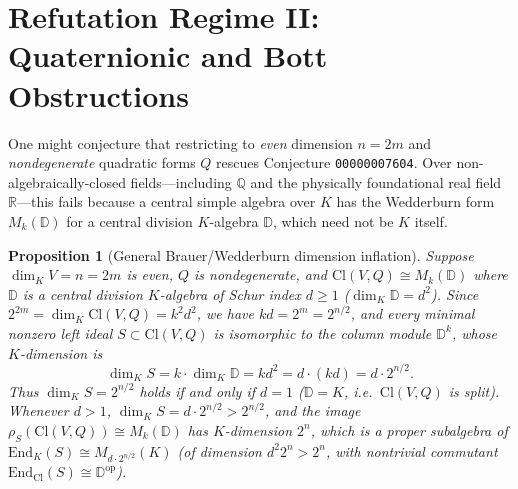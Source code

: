 \documentclass[11pt,a4paper]{article}
\theoremstyle{plain}
\newtheorem{proposition}[theorem]{Proposition}
\theoremstyle{definition}
\theoremstyle{remark}
\newcommand{\Cl}{\mathrm{Cl}}
\newcommand{\End}{\mathrm{End}}
\begin{document}
\section{Refutation Regime II: Quaternionic and Bott Obstructions}

One might conjecture that restricting to \emph{even} dimension $n = 2m$ and \emph{nondegenerate} quadratic forms $Q$ rescues Conjecture \texttt{00000007604}. Over non-algebraically-closed fields---including $\mathbb{Q}$ and the physically foundational real field $\mathbb{R}$---this fails because a central simple algebra over $K$ has the Wedderburn form $M_k(\mathbb{D})$ for a central division $K$-algebra $\mathbb{D}$, which need not be $K$ itself.

\begin{proposition}[General Brauer/Wedderburn dimension inflation]\label{prop:wedderburn}
Suppose $\dim_K V = n = 2m$ is even, $Q$ is nondegenerate, and $\Cl(V, Q) \cong M_k(\mathbb{D})$ where $\mathbb{D}$ is a central division $K$-algebra of Schur index $d \ge 1$ ($\dim_K \mathbb{D} = d^2$). Since $2^{2m} = \dim_K \Cl(V, Q) = k^2 d^2$, we have $k d = 2^m = 2^{n/2}$, and every minimal nonzero left ideal $S \subset \Cl(V, Q)$ is isomorphic to the column module $\mathbb{D}^k$, whose $K$-dimension is
\begin{equation}\label{eq:schur-dim}
  \dim_K S = k \cdot \dim_K \mathbb{D} = k d^2 = d \cdot (kd) = d \cdot 2^{n/2}.
\end{equation}
Thus $\dim_K S = 2^{n/2}$ holds if and only if $d = 1$ ($\mathbb{D} = K$, i.e.\ $\Cl(V, Q)$ is split). Whenever $d > 1$, $\dim_K S = d \cdot 2^{n/2} > 2^{n/2}$, and the image $\rho_S(\Cl(V, Q)) \cong M_k(\mathbb{D})$ has $K$-dimension $2^n$, which is a proper subalgebra of $\End_K(S) \cong M_{d \cdot 2^{n/2}}(K)$ (of dimension $d^2 2^n > 2^n$, with nontrivial commutant $\End_{\Cl}(S) \cong \mathbb{D}^{\mathrm{op}}$).
\end{proposition}
\end{document}
